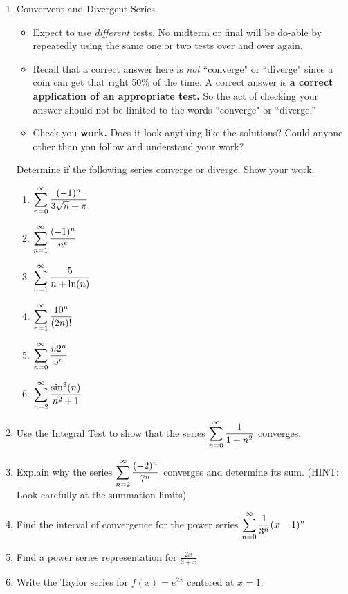 \documentclass[11pt,fleqn]{article}
\begin{document}
\begin{enumerate}
\item Convervent and Divergent Series
	\begin{itemize}
	\item Expect to use \emph{different} tests. No midterm or final will be do-able by repeatedly using the same one or two tests over and over again.
	\item Recall that a correct answer here is \emph{not} ``converge" or ``diverge" since a coin can get that right 50\% of the time. A correct answer is \textbf{a correct application of an appropriate test.} So the act of checking your answer should not be limited to the words ``converge" or ``diverge.''
	\item Check you \textbf{work.} Does it look anything like the solutions? Could anyone other than you follow and understand your work?
	\end{itemize}
	
	Determine if the following series converge or diverge. Show your work.
	
	\begin{enumerate}
	\item $\displaystyle \sum_{n=0}^\infty \frac{(-1)^n}{3\sqrt{n}+\pi}$
	\item $\displaystyle \sum_{n=1}^\infty \frac{(-1)^n}{n^e}$
	\item $\displaystyle \sum_{n=1}^\infty \frac{5}{n+\ln(n)}$
	\item $\displaystyle \sum_{n=1}^\infty \frac{10^n}{(2n)!}$
	\item $\displaystyle \sum_{n=0}^\infty \frac{n2^n}{5^n}$
	\item $\displaystyle \sum_{n=2}^\infty \frac{\sin^3(n)}{n^2+1}$
	\end{enumerate}
\item Use the Integral Test to show that the series $\displaystyle \sum_{n=0}^\infty \frac{1}{1+n^2}$ converges.
\item Explain why the series $\displaystyle \sum_{n=2}^\infty \frac{(-2)^n}{7^n}$ converges and determine its sum. (HINT: Look carefully at the summation limits)
\item Find the interval of convergence for the power series 
	$\displaystyle \sum_{n=0}^\infty \frac{1}{3^n}(x-1)^n$
\item Find a power series representation for $\frac{2x}{3+x}$ 	
\item Write the Taylor series for $f(x)=e^{2x}$ centered at $x=1.$
\end{enumerate}
\end{document}
